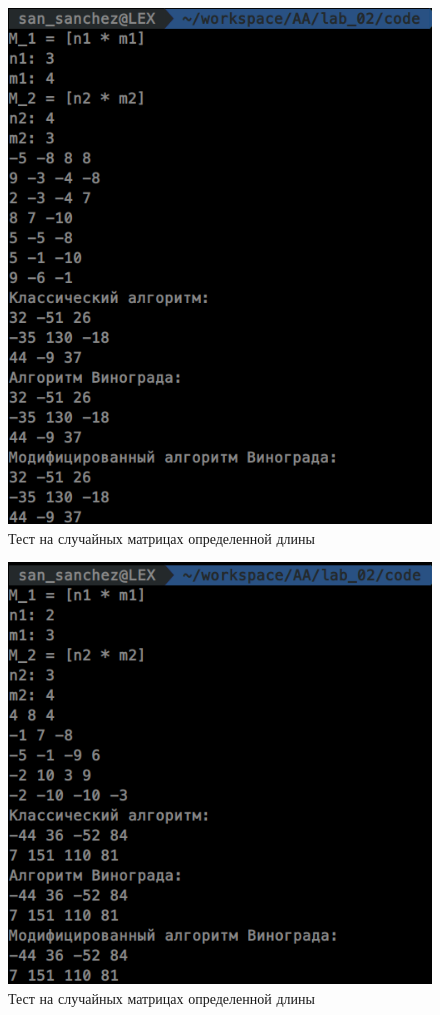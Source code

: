 \begin{figure}[H]
\centering
\includegraphics[scale=0.75]{./pict/wrk2.png}
\caption{Тест на случайных матрицах определенной длины}
\end{figure}
\begin{figure}[H]
\centering
\includegraphics[scale=0.75]{./pict/wrk3.png}
\caption{Тест на случайных матрицах определенной длины}
\end{figure}
